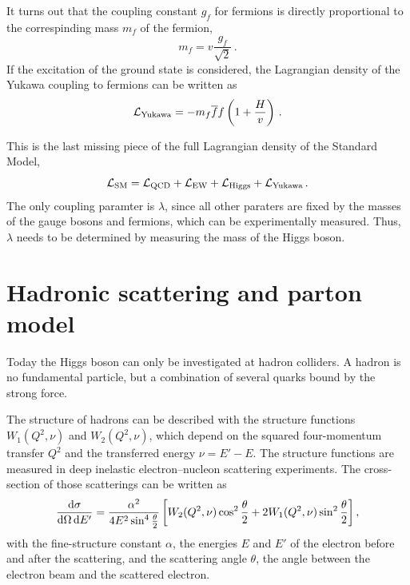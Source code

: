 It turns out that the coupling constant $g_f$ for fermions is directly proportional to the correspinding mass $m_f$ of the fermion,
\begin{equation}
    m_f  = v \frac{g_f}{\sqrt{2}} \,.
\end{equation}
If the excitation of the ground state is considered, the Lagrangian density of the Yukawa coupling to fermions can be written as
\begin{equation}
    \mathcal{L}_\text{Yukawa} = - m_f \overline{f} f \left(1 + \frac{H}{v}\right) \,.
\end{equation}

This is the last missing piece of the full Lagrangian density of the Standard Model,
\begin{equation}
    \mathcal{L}_\text{SM} = \mathcal{L}_\text{QCD} + \mathcal{L}_\text{EW} + \mathcal{L}_\text{Higgs} + \mathcal{L}_\text{Yukawa} \,.
\end{equation}
The only coupling paramter is $\lambda$, since all other paraters are fixed by the masses of the gauge bosons and fermions, which
can be experimentally measured.
Thus, $\lambda$ needs to be determined by measuring the mass of the Higgs boson.

\section{Hadronic scattering and parton model}\label{sec:theory:hadronscattering}

Today the Higgs boson can only be investigated at hadron colliders.
A hadron is no fundamental particle, but a combination of several quarks bound by the strong force.

The structure of hadrons can be described with the structure functions $W_1(Q^2, \nu)$ and $W_2(Q^2, \nu)$,
which depend on the squared four-momentum transfer $Q^2$ and the transferred energy $\nu = E' - E$.
The structure functions are measured in deep inelastic electron--nucleon scattering experiments.
The cross-section of those scatterings can be written as~\cite{drell64, bjo:scaling}
\begin{equation}
    \frac{\dif \sigma}{\dif\Omega \dif E'} = \frac{\alpha^2}{4 E^2 \sin^4 \frac{\theta}{2}}
    \left[ W_2(Q^2, \nu) \cos^2 \frac{\theta}{2} + 2 W_1(Q^2, \nu) \sin^2 \frac{\theta}{2} \right ],
\end{equation}
with the fine-structure constant $\alpha$, the energies $E$ and $E'$ of the electron before and after the scattering,
and the scattering angle $\theta$, the angle between the electron beam and the scattered electron.

